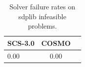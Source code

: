 \begin{table}
\centering
\caption{Solver failure rates on sdplib infeasible problems.}
\label{t-sdplib infeasible-failure}
\begin{tabular}{lcc}
\toprule
 SCS-3.0 &  COSMO \\
\midrule
    0.00 &   0.00 \\
\bottomrule
\end{tabular}
\end{table}

